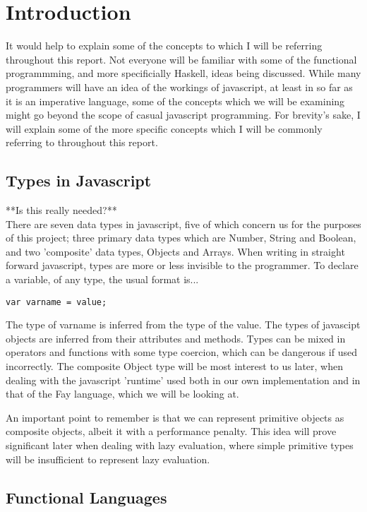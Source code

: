 
\section{Introduction}
It would help to explain some of the concepts to which I will be referring 
throughout this report. Not everyone will be familiar with some of the 
functional programmming, and more specificially Haskell, ideas being discussed.
While many programmers will have an idea of the workings of javascript, at
least in so far as it is an imperative language, some of the concepts which 
we will be examining might go beyond the scope of casual javascript programming.
For brevity's sake, I will explain some of the more specific concepts which 
I will be commonly referring to throughout this report.

\subsection{Types in Javascript}
**Is this really needed?**
\\
There are seven data types in javascript, five of which concern us for the purposes
of this project; three primary data types which are Number, String and Boolean, 
and two 'composite' data types, Objects and Arrays. When writing in straight
forward javascript, types are more or less invisible to the programmer. To declare
a variable, of any type, the usual format is...
\begin{verbatim}
var varname = value;
\end{verbatim}
The type of varname is inferred from the type of the value. The types of javascipt
objects are inferred from their attributes and methods. Types can be mixed
in operators and functions with some type coercion, which can be dangerous
if used incorrectly. The composite Object type will be most interest to us later,
when dealing with the javascript 'runtime' used both in our own implementation
and in that of the Fay language, which we will be looking at.

An important point to remember is that we can represent primitive objects as
composite objects, albeit it with a performance penalty. This idea will prove
significant later when dealing with lazy evaluation, where simple primitive
types will be insufficient to represent lazy evaluation.

\subsection{Functional Languages}


